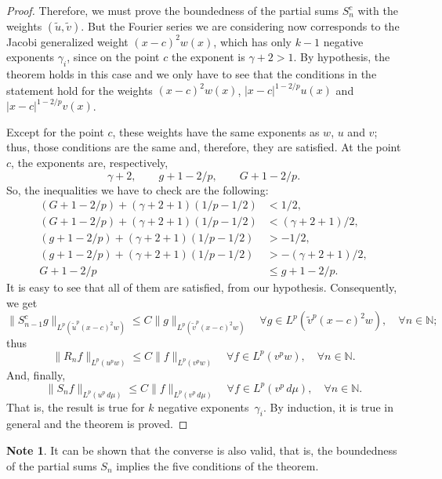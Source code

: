 \documentclass[a4paper,12pt]{article}
\theoremstyle{plain}
\theoremstyle{definition}
\newtheorem*{note}{Note}
\newcommand{\N}{\mathbb{N}}
\begin{document}
\begin{proof}
Therefore, we must prove the boundedness of the partial sums
$S_{n}^{c}$ with the weights $( \tilde{u}, \tilde{v} )$.
But the Fourier series we are considering now corresponds to
the Jacobi generalized weight $(x-c)^{2}w(x)$, which has only $k-1$
negative exponents $\gamma_{i}$, since on the point $c$ the
exponent is $\gamma + 2 > 1$.
By hypothesis, the theorem holds in this case and we only have
to see that the conditions in the statement hold for the weights
$(x-c)^{2}w(x)$, $| x - c |^{1-2/p} u(x)$
and $| x - c |^{1-2/p} v(x)$.

Except for the point $c$, these weights have the same exponents
as $w$, $u$ and $v$; thus, those conditions are the same and, therefore,
they are satisfied. At the point $c$, the exponents are, respectively,
$$
\gamma + 2,\qquad g + 1 - 2/p,\qquad G + 1 - 2/p.
$$
So, the inequalities we have to check are the following:
\begin{align*}
(G + 1 - 2/p) + ( \gamma + 2 + 1 ) (1/p - 1/2 ) &< 1/2,\\
(G + 1 - 2/p) + ( \gamma + 2 + 1 ) (1/p - 1/2 ) &< ( \gamma + 2 + 1 )/2,\\
(g + 1 - 2/p) + ( \gamma + 2 + 1 ) (1/p - 1/2 ) &> - 1/2,\\
(g + 1 - 2/p) + ( \gamma + 2 + 1 ) (1/p - 1/2 ) &> - ( \gamma + 2 + 1 )/2,\\
G + 1 - 2/p &\leq g + 1 - 2/p.
\end{align*}
It is easy to see that all of them are satisfied, from our hypothesis.
Consequently, we get
$$
\| S_{n-1}^{c}g \|_{L^{p}({\tilde{u}}^{p}(x-c)^{2}w)}
\leq C \| g \|_{L^{p}({\tilde{v}}^{p}(x-c)^{2}w)}
\quad\forall g \in L^{p}({\tilde{v}}^{p}(x-c)^{2}w),
\quad\forall n \in \N;
$$
thus
$$
\| R_{n}f \|_{L^{p}(u^{p}w)} \leq C \| f \|_{L^{p}(v^{p}w)}
\quad\forall f \in L^{p}(v^{p}w), \quad\forall n \in \N.
$$
And, finally,
$$
\| S_{n}f \|_{L^{p}(u^{p}\,d\mu)} \leq C \| f \|_{L^{p}(v^{p}\,d\mu)}
\quad\forall f \in L^{p}(v^{p}\,d\mu), \quad\forall n \in \N.
$$
That is, the result is true for $k$ negative exponents~$\gamma_{i}$.
By induction, it is true in general and the theorem is proved.
\end{proof}

\begin{note}
It can be shown that the converse is also valid, that
is, the boundedness of the partial sums $S_{n}$ implies the
five conditions of the theorem.
\end{note}
\end{document}
